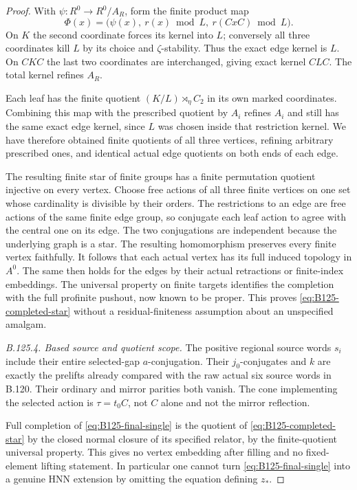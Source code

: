 \begin{proof}
With $\psi:R^0\to R^0/A_R$, form the finite product map
\begin{equation}\label{eq:B125-finite-central-map}
 \Phi(x)=\bigl(\psi(x),\ r(x)\bmod L,\ r(CxC)\bmod L\bigr).
\end{equation}
On $K$ the second coordinate forces its kernel into $L$; conversely
all three coordinates kill $L$ by its choice and $\zeta$-stability.
Thus the exact edge kernel is $L$. On $CKC$ the last two coordinates
are interchanged, giving exact kernel $CLC$. The total kernel
refines $A_R$.

Each leaf has the finite quotient
$(K/L)\rtimes_\eta C_2$ in its own marked coordinates. Combining
this map with the prescribed quotient by $A_i$ refines $A_i$
and still has the same exact edge kernel, since $L$ was chosen
inside that restriction kernel. We have therefore obtained finite
quotients of all three vertices, refining arbitrary prescribed
ones, and identical actual edge quotients on both ends of each
edge.

The resulting finite star of finite groups has a finite permutation
quotient injective on every vertex. Choose free actions of all
three finite vertices on one set whose cardinality is divisible
by their orders. The restrictions to an edge are free actions of
the same finite edge group, so conjugate each leaf action to agree
with the central one on its edge. The two conjugations are
independent because the underlying graph is a star. The resulting
homomorphism preserves every finite vertex faithfully.
It follows that each actual vertex has its full induced topology
in $A^0$. The same then holds for the edges by their actual
retractions or finite-index embeddings. The universal property
on finite targets identifies the completion with the full
profinite pushout, now known to be proper. This proves
\eqref{eq:B125-completed-star} without a residual-finiteness
assumption about an unspecified amalgam.

\emph{B.125.4. Based source and quotient scope.}
The positive regional source words $s_i$ include their entire
selected-gap $a$-conjugation. Their $j_0$-conjugates and $k$ are
exactly the prelifts already compared with the raw actual six
source words in B.120. Their ordinary and mirror parities both
vanish. The cone implementing the selected action is
$\tau=t_0C$, not $C$ alone and not the mirror reflection.

Full completion of \eqref{eq:B125-final-single} is the quotient
of \eqref{eq:B125-completed-star} by the closed normal closure
of its specified relator, by the finite-quotient universal
property. This gives no vertex embedding after filling and no
fixed-element lifting statement. In particular one cannot turn
\eqref{eq:B125-final-single} into a genuine HNN extension by
omitting the equation defining $z_*$.
\end{proof}

